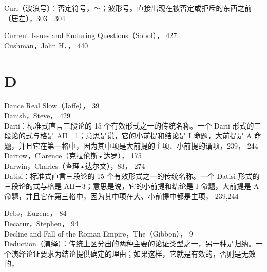 Curl（波浪号）：否定符号，～；波形号。直接出现在被否定或拒斥的东西之前（居左），303－304

Current Issues and Enduring Questions（Sobol）， 427\\
Cushman，John H．， 440

\section*{D}
Dance Real Slow（Jaffe）， 39\\
Danish，Steve， 429\\
Darii：标准式直言三段论的 15 个有效形式之一的传统名称。一个 Darii 形式的三段论的式与格是 AII－1；意思是说，它的小前提和结论是 I 命题，大前提是 A 命题，并且它在第一格中，因为其中项是大前提的主项、小前提的谓项，239， 244\\
Darrow，Clarence（克拉伦斯•达罗）， 175\\
Darwin，Charles（查理•达尔文），83， 274\\
Datisi：标准式直言三段论的 15 个有效形式之一的传统名称。一个 Datisi 形式的三段论的式与格是 AII－3；意思是说，它的小前提和结论是 I 命题，大前提是 A 命题，并且它在第三格中，因为其中项在大、小前提中都是主项， 239,244

Debs，Eugene， 84\\
Decatur，Stephen， 94\\
Decline and Fall of the Roman Empire，The（Gibbon）， 9\\
Deduction（演绎）：传统上区分出的两种主要的论证类型之一，另一种是归纳。一个演绎论证要求为结论提供确定的理由；如果这样，它就是有效的，否则是无效的，


